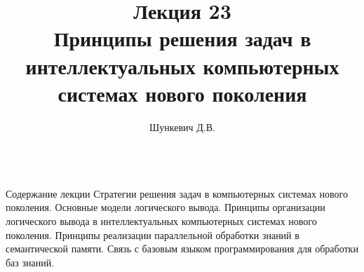\title{Лекция 23\\Принципы решения задач в интеллектуальных компьютерных системах нового поколения}
\author[]{Шункевич Д.В.}

\begin{frame}
	\titlepage
\end{frame}

\begin{frame}{\\Содержание лекции}
	\topline
	\justifying
	Стратегии решения задач в компьютерных системах нового поколения. Основные модели логического вывода. Принципы организации логического вывода в интеллектуальных компьютерных системах нового поколения. Принципы реализации параллельной обработки знаний в семантической памяти. Связь с базовым языком программирования для обработки баз знаний. 
\end{frame}